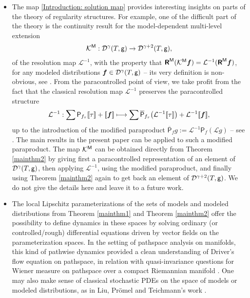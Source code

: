 \documentclass[10pt]{amsart}
\newcommand\mto{\mathchoice{\longmapsto}{\mapsto}{\mapsto}{\mapsto}}
\theoremstyle{plain}
\theoremstyle{definition}
\newcommand{\Brac}[1]{[\![#1]\!]}
\newcommand{\bsf}{\boldsymbol{f}}
\newcommand{\reR}{\boldsymbol{\mathsf{R}}}
\newcommand{\sfP}{\mathsf{P}}
\newcommand{\mcD}{\mathcal{D}}
\newcommand{\mcK}{\mathcal{K}}
\newcommand{\mcL}{\mathcal{L}}
\begin{document}
\begin{itemize}
	\item The map \eqref {Introduction: solution map} provides interesting insights on parts of the theory of regularity structures. For example, one of the difficult part of the theory is the continuity result for the model-dependent multi-level extension
\[
\mcK^{\sf M}: \mcD^\gamma(T,{\sf g}) \to \mcD^{\gamma+2}(T,{\sf g}),
\]
of the resolution map $\mcL^{-1}$, with the property that $\reR^{\sf M}(\mcK^{\sf M}\bsf)=\mcL^{-1}(\reR^{\sf M}\bsf)$, for any modeled distributions $\bsf\in\mcD^\gamma(T,{\sf g})$ -- its very definition is non-obvious, see \cite[\S 5]{Hai}. From the paracontrolled
point of view, we take profit from the fact that the classical resolution map $\mcL^{-1}$ preserves the paracontrolled structure
\[
\mcL^{-1}:\sum \sfP_{f_\tau}\Brac{\tau}+\Brac{\bsf}\mto \sum \overline{\sfP}_{f_\tau}\bigl(\mcL^{-1}\Brac{\tau}\bigr) + \mcL^{-1}\Brac{\bsf},
\]
up to the introduction of the modified paraproduct $\overline{\sfP}_fg := \mcL^{-1}\sfP_f(\mcL g)$ -- see \cite{BB16}. The main results in the present paper can be applied to such a modified paraproduct. The map $\mcK^{\sf M}$ can be obtained directly from Theorem \ref{mainthm2} by giving first a paracontrolled representation of an element of $\mcD^\gamma(T,{\sf g})$, then applying $\mcL^{-1}$, using the modified paraproduct, and finally using Theorem \ref{mainthm2} again to get back an element of $\mcD^{\gamma+2}(T,{\sf g})$. We do not give the details here and leave it to a future work.
	
	\item The local Lipschitz parameterizations of the sets of models and modeled distributions from Theorem \ref{mainthm1} and Theorem \ref{mainthm2} offer the possibility to define dynamics in these spaces by solving ordinary (or controlled/rough) differential equations driven by vector fields on the parameterization spaces. In the setting of pathspace analysis on manifolds, this kind of pathwise dynamics provided a clean understanding of Driver's flow equation on pathspace, in relation with quasi-invariance questions for Wiener measure on pathspace over a compact Riemannian manifold \cite{DriverFlow, LyonsQian, BailleulRegularity}. One may also make sense of classical stochastic PDEs on the space of models or modeled distributions, as in Liu, Prömel and Teichmann's work \cite{LPT18}.
\end{itemize}
\end{document}
